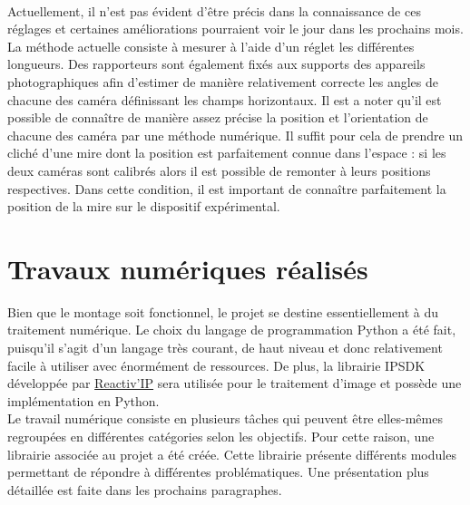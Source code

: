 \documentclass[a4paper, 11pt]{article}
\begin{document}
		\\Actuellement, il n'est pas évident d'être précis dans la connaissance de ces réglages et certaines améliorations pourraient voir le jour dans les prochains mois. La méthode actuelle consiste à mesurer à l'aide d'un réglet les différentes longueurs. Des rapporteurs sont également fixés aux supports des appareils photographiques afin d'estimer de manière relativement correcte les angles de chacune des caméra définissant les champs horizontaux. Il est a noter qu'il est possible de connaître de manière assez précise la position et l'orientation de chacune des caméra par une méthode numérique. Il suffit pour cela de prendre un cliché d'une mire dont la position est parfaitement connue dans l'espace : si les deux caméras sont calibrés alors il est possible de remonter à leurs positions respectives. Dans cette condition, il est important de connaître parfaitement la position de la mire sur le dispositif expérimental.

\section{Travaux numériques réalisés}
	Bien que le montage soit fonctionnel, le projet se destine essentiellement à du traitement numérique. Le choix du langage de programmation Python a été fait, puisqu'il s'agit d'un langage très courant, de haut niveau et donc relativement facile à utiliser avec énormément de ressources. De plus, la librairie IPSDK développée par \href{https://www.reactivip.com/fr/accueil/}{Reactiv'IP} sera utilisée pour le traitement d'image et possède une implémentation en Python.
	\\Le travail numérique consiste en plusieurs tâches qui peuvent être elles-mêmes regroupées en différentes catégories selon les objectifs. Pour cette raison, une librairie associée au projet a été créée. Cette librairie présente différents modules permettant de répondre à différentes problématiques. Une présentation plus détaillée est faite dans les prochains paragraphes.
\end{document}
